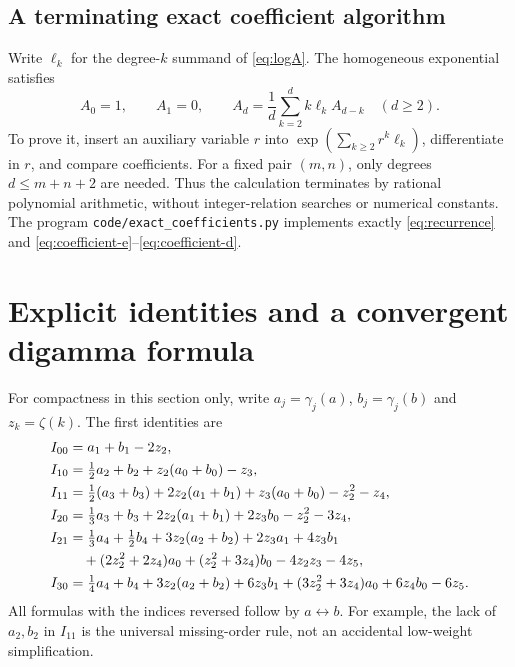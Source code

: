 \documentclass[11pt]{article}
\numberwithin{equation}{section}
\theoremstyle{definition}
\theoremstyle{remark}
\newcommand{\file}[1]{\nolinkurl{#1}}
\begin{document}
\subsection{A terminating exact coefficient algorithm}
Write $\ell_k$ for the degree-$k$ summand of \eqref{eq:logA}.
The homogeneous exponential satisfies
\begin{equation}
 A_0=1,\qquad A_1=0,\qquad
 A_d=\frac1d\sum_{k=2}^d k\ell_k A_{d-k}\quad(d\ge2).
 \label{eq:recurrence}
\end{equation}
To prove it, insert an auxiliary variable $r$ into
$\exp(\sum_{k\ge2}r^k\ell_k)$, differentiate in $r$, and compare
coefficients. For a fixed pair $(m,n)$, only degrees $d\le m+n+2$ are
needed. Thus the calculation terminates by rational polynomial
arithmetic, without integer-relation searches or numerical constants.
The program \file{code/exact_coefficients.py} implements exactly
\eqref{eq:recurrence} and \eqref{eq:coefficient-e}--\eqref{eq:coefficient-d}.

\section{Explicit identities and a convergent digamma formula}
\label{sec:examples}

For compactness in this section only, write
$a_j=\gamma_j(a)$, $b_j=\gamma_j(b)$ and $z_k=\zeta(k)$.
The first identities are
\begin{align}
 I_{00}&=a_1+b_1-2z_2,\label{eq:I00}\\
 I_{10}&=\tfrac12a_2+b_2+z_2(a_0+b_0)-z_3,\label{eq:I10}\\
 I_{11}&=\tfrac12(a_3+b_3)+2z_2(a_1+b_1)
                       +z_3(a_0+b_0)-z_2^2-z_4,\label{eq:I11}\\
 I_{20}&=\tfrac13a_3+b_3+2z_2(a_1+b_1)+2z_3b_0-z_2^2-3z_4,
                       \label{eq:I20}\\
 I_{21}&=\tfrac13a_4+\tfrac12b_4+3z_2(a_2+b_2)
                  +2z_3a_1+4z_3b_1\notag\\
       &\quad +(2z_2^2+2z_4)a_0+(z_2^2+3z_4)b_0
                    -4z_2z_3-4z_5,\label{eq:I21}\\
 I_{30}&=\tfrac14a_4+b_4+3z_2(a_2+b_2)+6z_3b_1
                    +(3z_2^2+3z_4)a_0+6z_4b_0-6z_5.
                    \label{eq:I30}
\end{align}
All formulas with the indices reversed follow by $a\leftrightarrow b$.
For example, the lack of $a_2,b_2$ in $I_{11}$ is the universal
missing-order rule, not an accidental low-weight simplification.
\end{document}
